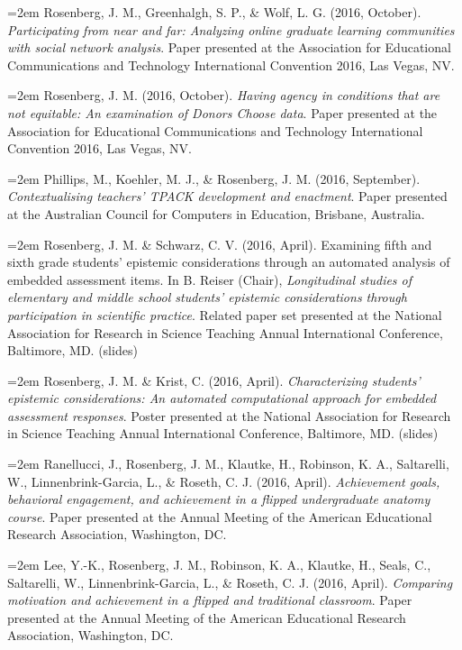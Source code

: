 \documentclass[
  14,
]{article}
\begin{document}
\hangindent=2em Rosenberg, J. M., Greenhalgh, S. P., \& Wolf, L. G.
(2016, October). \emph{Participating from near and far: Analyzing online
graduate learning communities with social network analysis}. Paper
presented at the Association for Educational Communications and
Technology International Convention 2016, Las Vegas, NV.

\hangindent=2em Rosenberg, J. M. (2016, October). \emph{Having agency in
conditions that are not equitable: An examination of Donors Choose
data}. Paper presented at the Association for Educational Communications
and Technology International Convention 2016, Las Vegas, NV.

\hangindent=2em Phillips, M., Koehler, M. J., \& Rosenberg, J. M. (2016,
September). \emph{Contextualising teachers' TPACK development and
enactment}. Paper presented at the Australian Council for Computers in
Education, Brisbane, Australia.

\hangindent=2em Rosenberg, J. M. \& Schwarz, C. V. (2016, April).
Examining fifth and sixth grade students' epistemic considerations
through an automated analysis of embedded assessment items. In B. Reiser
(Chair), \emph{Longitudinal studies of elementary and middle school
students' epistemic considerations through participation in scientific
practice}. Related paper set presented at the National Association for
Research in Science Teaching Annual International Conference, Baltimore,
MD. (slides)

\hangindent=2em Rosenberg, J. M. \& Krist, C. (2016, April).
\emph{Characterizing students' epistemic considerations: An automated
computational approach for embedded assessment responses}. Poster
presented at the National Association for Research in Science Teaching
Annual International Conference, Baltimore, MD. (slides)

\hangindent=2em Ranellucci, J., Rosenberg, J. M., Klautke, H., Robinson,
K. A., Saltarelli, W., Linnenbrink-Garcia, L., \& Roseth, C. J. (2016,
April). \emph{Achievement goals, behavioral engagement, and achievement
in a flipped undergraduate anatomy course}. Paper presented at the
Annual Meeting of the American Educational Research Association,
Washington, DC.

\hangindent=2em Lee, Y.-K., Rosenberg, J. M., Robinson, K. A., Klautke,
H., Seals, C., Saltarelli, W., Linnenbrink-Garcia, L., \& Roseth, C. J.
(2016, April). \emph{Comparing motivation and achievement in a flipped
and traditional classroom}. Paper presented at the Annual Meeting of the
American Educational Research Association, Washington, DC.
\end{document}
